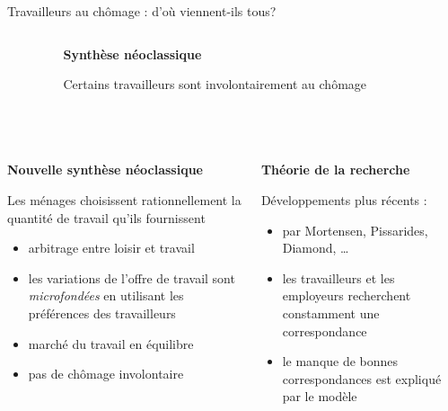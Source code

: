 \documentclass[
  ignorenonframetext,
  aspectratio=169,
]{beamer}
\providecommand{\tightlist}{%
  \setlength{\itemsep}{0pt}\setlength{\parskip}{0pt}}\usepackage{longtable,booktabs,array}
\begin{document}
\begin{frame}{Travailleurs au chômage : d'où viennent-ils tous?}
\label{travailleurs-au-chuxf4mage-douxf9-viennent-ils-tous}
\begin{columns}[T]
\begin{column}{0.48\textwidth}
\end{column}

\begin{column}{0.33\textwidth}
\textbf{Synthèse néoclassique}

Certains travailleurs sont involontairement au chômage
\end{column}

\begin{column}{0.48\textwidth}
\end{column}
\end{columns}

~

\begin{columns}[T]
\begin{column}{0.48\textwidth}
\textbf{Nouvelle synthèse néoclassique}

Les ménages choisissent rationnellement la quantité de travail qu'ils
fournissent

\begin{itemize}
\tightlist
\item
  arbitrage entre loisir et travail
\item
  les variations de l'offre de travail sont \emph{microfondées} en
  utilisant les préférences des travailleurs
\item
  marché du travail en équilibre
\item
  pas de chômage involontaire
\end{itemize}
\end{column}

\begin{column}{0.48\textwidth}
\textbf{Théorie de la recherche}

Développements plus récents :

\begin{itemize}
\tightlist
\item
  par Mortensen, Pissarides, Diamond, \ldots{}
\item
  les travailleurs et les employeurs recherchent constamment une
  correspondance
\item
  le manque de bonnes correspondances est expliqué par le modèle
\end{itemize}
\end{column}
\end{columns}
\end{frame}
\end{document}
